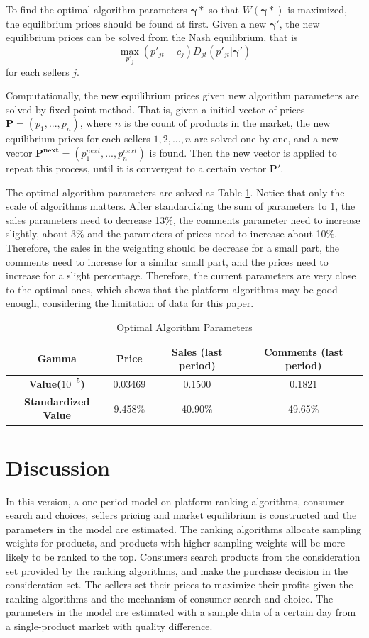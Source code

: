 \documentclass{article}
\begin{document}
To find the optimal algorithm parameters $\mathbf{\gamma}*$ so that $W(\mathbf{\gamma}*)$ is maximized, the equilibrium prices should be found at first. Given a new $\mathbf{\gamma}'$, the new equilibrium prices can be solved from the Nash equilibrium, that is
$$
\max_{p'_j} (p'_{jt}-c_{j})D_{jt}(p'_{jt}|\mathbf{\gamma}')
$$ 
for each sellers $j$.

Computationally, the new equilibrium prices given new algorithm parameters are solved by fixed-point method. That is, given a initial vector of prices $\mathbf{P}=(p_1, ..., p_n)$, where $n$ is the count of products in the market, the new equilibrium prices for each sellers $1, 2,..., n$ are solved one by one, and a new vector $\mathbf{P^{next}}=(p^{next}_1, ..., p^{next}_n)$ is found. Then the new vector is applied to repeat this process, until it is convergent to a certain vector $\mathbf{P'}$. 

The optimal algorithm parameters are solved as Table \ref{gamma_opt}. Notice that only the scale of algorithms matters. After standardizing the sum of parameters to 1, the sales parameters need to decrease 13\%, the comments parameter need to increase slightly, about 3\% and the parameters of prices need to increase about 10\%. Therefore,  the sales in the weighting should be decrease for a small part, the comments need to increase for a similar small part, and the prices need to increase for a slight percentage. Therefore, the current parameters are very close to the optimal ones, which shows that the platform algorithms may be good enough, considering the limitation of data for this paper. 

\begin{table}[H]
\centering
\begin{tabular}{|c|c|c|c|}
\hline
\textbf{Gamma} & \textbf{Price} & \textbf{Sales (last period)} & \textbf{Comments (last period)}\\ 
\hline
 \textbf{Value($10^{-5}$)} & 0.03469 & 0.1500 & 0.1821 \\  
\hline 
 \textbf{Standardized Value} & 9.458\% & 40.90\% & 49.65\% \\ 
 \hline
\end{tabular}
\caption{\label{gamma_opt}Optimal Algorithm Parameters}
\end{table}


\section{Discussion}
In this version, a one-period model on platform ranking algorithms, consumer search and choices, sellers pricing and market equilibrium is constructed and the parameters in the model are estimated. The ranking algorithms allocate sampling weights for products, and products with higher sampling weights will be more likely to be ranked to the top. Consumers search products from the consideration set provided by the ranking algorithms, and make the purchase decision in the consideration set. The sellers set their prices to maximize their profits given the ranking algorithms and the mechanism of consumer search and choice. The parameters in the model are estimated with a sample data of a certain day from a single-product market with quality difference. 
\end{document}

